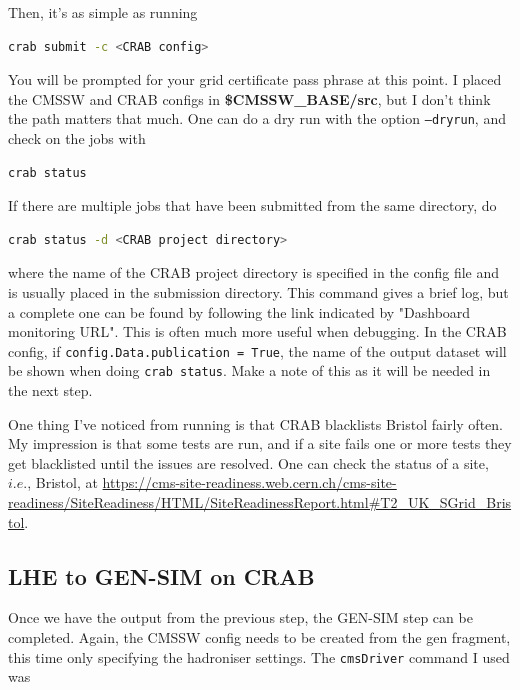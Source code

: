 Then, it's as simple as running

\begin{lstlisting}[belowskip=-0.7cm, language=sh, numbers=none]
crab submit -c <CRAB config>
\end{lstlisting}

You will be prompted for your grid certificate pass phrase at this point. I placed the CMSSW and CRAB configs in \textbf{\$CMSSW\_BASE/src}, but I don't think the path matters that much. One can do a dry run with the option \texttt{--dryrun}, and check on the jobs with

\begin{lstlisting}[belowskip=-0.7cm, language=sh, numbers=none]
crab status
\end{lstlisting}

If there are multiple jobs that have been submitted from the same directory, do

\begin{lstlisting}[belowskip=-0.7cm, language=sh, numbers=none]
crab status -d <CRAB project directory>
\end{lstlisting}

where the name of the CRAB project directory is specified in the config file and is usually placed in the submission directory. This command gives a brief log, but a complete one can be found by following the link indicated by "Dashboard monitoring URL". This is often much more useful when debugging. In the CRAB config, if \texttt{config.Data.publication = True}, the name of the output dataset will be shown when doing \texttt{crab status}. Make a note of this as it will be needed in the next step.

One thing I've noticed from running is that CRAB blacklists Bristol fairly often. My impression is that some tests are run, and if a site fails one or more tests they get blacklisted until the issues are resolved. One can check the status of a site, $i.e.$, Bristol, at \url{https://cms-site-readiness.web.cern.ch/cms-site-readiness/SiteReadiness/HTML/SiteReadinessReport.html#T2_UK_SGrid_Bristol}.


\subsection{LHE to GEN-SIM on CRAB}

Once we have the output from the previous step, the GEN-SIM step can be completed. Again, the CMSSW config needs to be created from the gen fragment, this time only specifying the hadroniser settings. The \texttt{cmsDriver} command I used was

